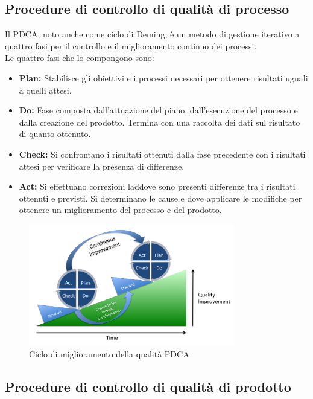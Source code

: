 	\subsection{Procedure di controllo di qualità di processo}
	Il PDCA, noto anche come ciclo di Deming, è un metodo di gestione iterativo a quattro fasi per il controllo e il miglioramento continuo dei processi.\\
	Le quattro fasi che lo compongono sono:
		\begin{itemize}
			\item \textbf{Plan:} \textnormal{Stabilisce gli obiettivi e i processi necessari per ottenere risultati uguali a quelli attesi.}
			\item \textbf{Do:} \textnormal{Fase composta dall'attuazione del piano, dall'esecuzione del processo e dalla creazione del prodotto. Termina con una raccolta dei dati sul risultato di quanto ottenuto.}
			\item \textbf{Check:} \textnormal{Si confrontano i risultati ottenuti dalla fase precedente con i risultati attesi per verificare la presenza di differenze.}
			\item \textbf{Act:} \textnormal{Si effettuano correzioni laddove sono presenti differenze tra i risultati ottenuti e previsti. Si determinano le cause e dove applicare le modifiche per ottenere un miglioramento del processo e del prodotto.}
		\end{itemize}
		\begin{figure}[h]
			\centering
			\includegraphics[width=90mm]{images/pdca.png}
			\caption{Ciclo di miglioramento della qualità PDCA}
		\end{figure}
	
	\subsection{Procedure di controllo di qualità di prodotto}
	
	
	\pagebreak